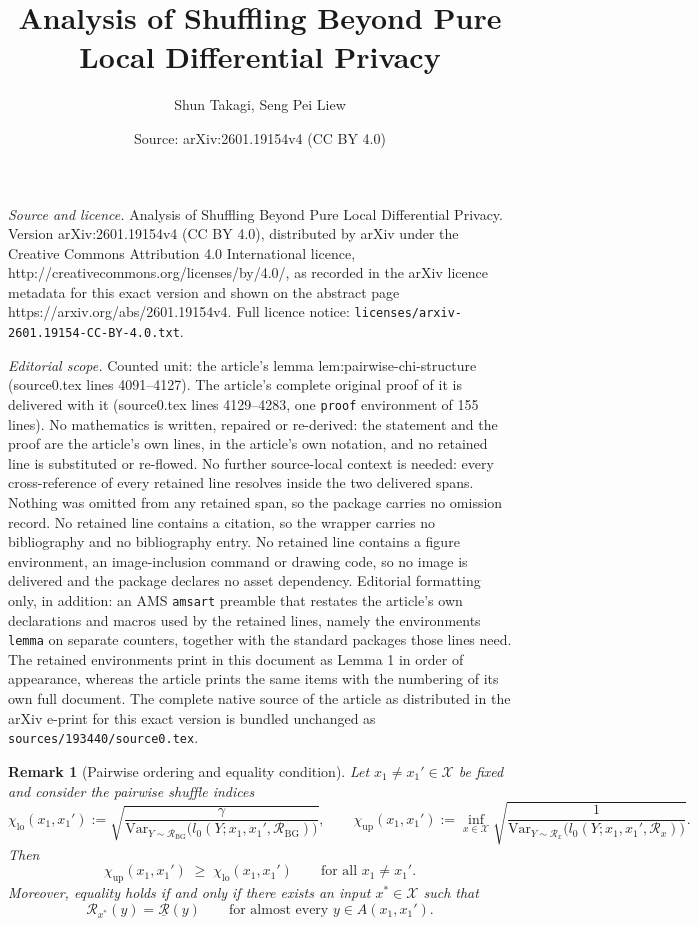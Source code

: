 \documentclass[10pt,a4paper]{amsart}
\title{Analysis of Shuffling Beyond Pure Local Differential Privacy}
\author{Shun Takagi, Seng Pei Liew}
\date{Source: arXiv:2601.19154v4 (CC BY 4.0)}
\newtheorem{lemma}{Remark}
\begin{document}
\maketitle

\noindent\emph{Source and licence.} Analysis of Shuffling Beyond Pure Local Differential Privacy. Version arXiv:2601.19154v4 (CC BY 4.0), distributed by arXiv under the Creative Commons Attribution 4.0 International licence, http://creativecommons.org/licenses/by/4.0/, as recorded in the arXiv licence metadata for this exact version and shown on the abstract page https://arxiv.org/abs/2601.19154v4. Full licence notice: \texttt{licenses/arxiv-2601.19154-CC-BY-4.0.txt}.\par\smallskip

\noindent\textit{Editorial scope.} Counted unit: the article's lemma lem:pairwise-chi-structure (source0.tex lines 4091--4127). The article's complete original proof of it is delivered with it (source0.tex lines 4129--4283, one \texttt{proof} environment of 155 lines). No mathematics is written, repaired or re-derived: the statement and the proof are the article's own lines, in the article's own notation, and no retained line is substituted or re-flowed.  No further source-local context is needed: every cross-reference of every retained line resolves inside the two delivered spans.  Nothing was omitted from any retained span, so the package carries no omission record.  No retained line contains a citation, so the wrapper carries no bibliography and no bibliography entry.  No retained line contains a figure environment, an image-inclusion command or drawing code, so no image is delivered and the package declares no asset dependency.  Editorial formatting only, in addition: an AMS \texttt{amsart} preamble that restates the article's own declarations and macros used by the retained lines, namely the environments \texttt{lemma} on separate counters, together with the standard packages those lines need.  The retained environments print in this document as Lemma 1 in order of appearance, whereas the article prints the same items with the numbering of its own full document.  The complete native source of the article as distributed in the arXiv e-print for this exact version is bundled unchanged as \texttt{sources/193440/source0.tex}.
\begin{lemma}[Pairwise ordering and equality condition]
\label{lem:pairwise-chi-structure}
Let $x_1\neq x_1'\in\mathcal X$ be fixed and consider the pairwise
shuffle indices
\[
  \chi_{\mathrm{lo}}(x_1,x_1')
  := \sqrt{
        \frac{\gamma}{
          \mathrm{Var}_{Y\sim\mathcal R_{\mathrm{BG}}}
          \bigl(l_0(Y;x_1,x_1',\mathcal R_{\mathrm{BG}})\bigr)
        }
      },
  \qquad
  \chi_{\mathrm{up}}(x_1,x_1')
  := \inf_{x\in\mathcal X}
      \sqrt{
        \frac{1}{
          \mathrm{Var}_{Y\sim\mathcal R_x}
          \bigl(l_0(Y;x_1,x_1',\mathcal R_x)\bigr)
        }
      }.
\]
Then
\[
  \chi_{\mathrm{up}}(x_1,x_1')
  \;\ge\;
  \chi_{\mathrm{lo}}(x_1,x_1')
  \qquad\text{for all }x_1\neq x_1'.
\]
Moreover, equality holds if and only if there exists an input
$x^\ast\in\mathcal X$ such that
\[
  \mathcal R_{x^\ast}(y)
  = \underline{\mathcal R}(y)
  \qquad\text{for almost every }y\in A(x_1,x_1').
\]
\end{lemma}
\end{document}
